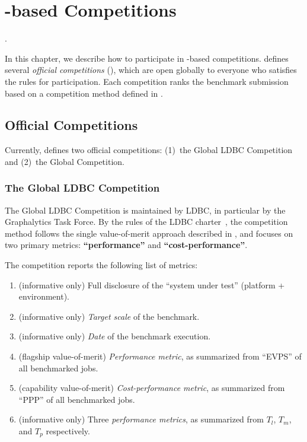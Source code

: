 \chapter{\toolname-based Competitions} \label{chap:competitions}

 .

In this chapter, we describe how to participate in \toolname-based competitions. 
\toolname{} defines several {\it official competitions} (), which are open globally to everyone who satisfies the rules for participation. Each competition ranks the benchmark submission based on a competition method defined in .




\section{Official \toolname{} Competitions}
\label{sec:competitions:overview}
Currently, \toolname{} defines two official competitions: (1)~the Global LDBC Competition and (2)~the Global \toolname{} Competition.


\subsection{The Global LDBC Competition} \label{sec:competitions:ldbc}
The Global LDBC Competition is maintained by LDBC, in particular by the Graphalytics Task Force. By the rules of the LDBC charter~\cite{ldbc_byelaws}, the competition method follows the single value-of-merit approach described in , and focuses on two primary metrics: {\bf ``performance''} and {\bf ``cost-performance''}.

The competition reports the following list of metrics:
\begin{enumerate}
    \item (informative only) Full disclosure of the ``system under test'' (platform + environment).
    \item (informative only) {\it Target scale} of the benchmark.
    \item (informative only) {\it Date} of the benchmark execution.
	\item (flagship value-of-merit) {\it Performance metric}, as summarized from ``EVPS'' of all benchmarked jobs.
	\item (capability value-of-merit) {\it Cost-performance metric}, as summarized from ``PPP'' of all benchmarked jobs.
	\item (informative only) Three {\it performance metrics}, as summarized from $T_l$, $T_m$, and $T_p$ respectively.
\end{enumerate}


